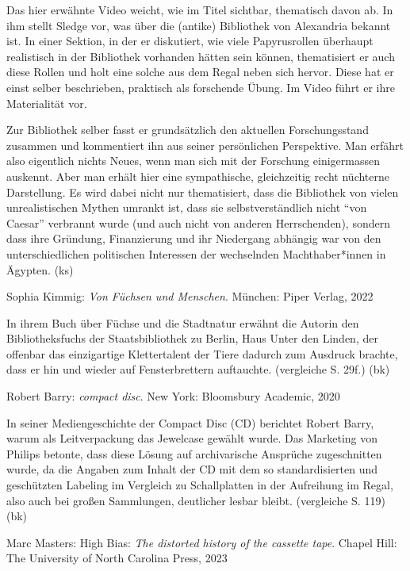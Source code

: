 \documentclass[a4paper,
fontsize=11pt,
oneside,
numbers=noperiodatend,
parskip=half-,
bibliography=totoc,
final
]{scrartcl}
\begin{document}
Das hier erwähnte Video weicht, wie im Titel sichtbar, thematisch davon
ab. In ihm stellt Sledge vor, was über die (antike) Bibliothek von
Alexandria bekannt ist. In einer Sektion, in der er diskutiert, wie
viele Papyrusrollen überhaupt realistisch in der Bibliothek vorhanden
hätten sein können, thematisiert er auch diese Rollen und holt eine
solche aus dem Regal neben sich hervor. Diese hat er einst selber
beschrieben, praktisch als forschende Übung. Im Video führt er ihre
Materialität vor.

Zur Bibliothek selber fasst er grundsätzlich den aktuellen
Forschungsstand zusammen und kommentiert ihn aus seiner persönlichen
Perspektive. Man erfährt also eigentlich nichts Neues, wenn man sich mit
der Forschung einigermassen auskennt. Aber man erhält hier eine
sympathische, gleichzeitig recht nüchterne Darstellung. Es wird dabei
nicht nur thematisiert, dass die Bibliothek von vielen unrealistischen
Mythen umrankt ist, dass sie selbstverständlich nicht \enquote{von
Caesar} verbrannt wurde (und auch nicht von anderen Herrschenden),
sondern dass ihre Gründung, Finanzierung und ihr Niedergang abhängig war
von den unterschiedlichen politischen Interessen der wechselnden
Machthaber*innen in Ägypten. (ks)

Sophia Kimmig: \emph{Von Füchsen und Menschen}. München: Piper Verlag,
2022

In ihrem Buch über Füchse und die Stadtnatur erwähnt die Autorin den
Bibliotheksfuchs der Staatsbibliothek zu Berlin, Haus Unter den Linden,
der offenbar das einzigartige Klettertalent der Tiere dadurch zum
Ausdruck brachte, dass er hin und wieder auf Fensterbrettern auftauchte.
(vergleiche S. 29f.) (bk)

Robert Barry: \emph{compact disc}. New York: Bloomsbury Academic, 2020

In seiner Mediengeschichte der Compact Disc (CD) berichtet Robert Barry,
warum als Leitverpackung das Jewelcase gewählt wurde. Das Marketing von
Philips betonte, dass diese Lösung auf archivarische Ansprüche
zugeschnitten wurde, da die Angaben zum Inhalt der CD mit dem so
standardisierten und geschützten Labeling im Vergleich zu Schallplatten
in der Aufreihung im Regal, also auch bei großen Sammlungen, deutlicher
lesbar bleibt. (vergleiche S. 119) (bk)

Marc Masters: High Bias: \emph{The distorted history of the cassette
tape}. Chapel Hill: The University of North Carolina Press, 2023
\end{document}
